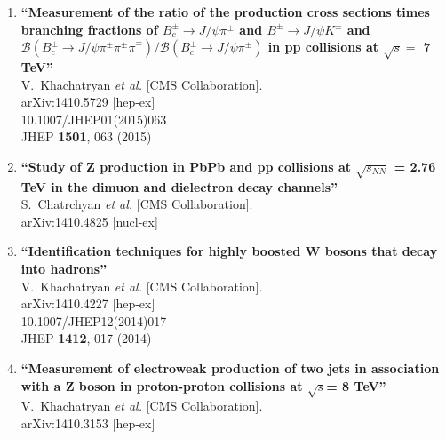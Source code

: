 \documentclass{article}
\begin{document}
\begin{enumerate}


\item%
{\bf ``Measurement of the ratio of the production cross sections times branching fractions of $B_{c}^{\pm} \to J/\psi \pi^{\pm}$ and $B^{\pm} \to J/\psi K^{\pm}$ and $\mathcal{B}(B_{c}^{\pm} \to J/\psi \pi^{\pm}\pi^{\pm}\pi^{\mp})/\mathcal{B}(B_{c}^{\pm} \to J/\psi \pi^{\pm})$ in pp collisions at $\sqrt{s} =$ 7 TeV''}
  \\{}V.~Khachatryan {\it et al.}  [CMS Collaboration].
  \\{}arXiv:1410.5729 [hep-ex]
    \\{}10.1007/JHEP01(2015)063
\\{}JHEP {\bf 1501}, 063 (2015) %


\item%
{\bf ``Study of Z production in PbPb and pp collisions at $\sqrt{s_{NN}}$ = 2.76 TeV in the dimuon and dielectron decay channels''}
  \\{}S.~Chatrchyan {\it et al.}  [CMS Collaboration].
  \\{}arXiv:1410.4825 [nucl-ex]
  


\item%
{\bf ``Identification techniques for highly boosted W bosons that decay into hadrons''}
  \\{}V.~Khachatryan {\it et al.}  [CMS Collaboration].
  \\{}arXiv:1410.4227 [hep-ex]
    \\{}10.1007/JHEP12(2014)017
\\{}JHEP {\bf 1412}, 017 (2014) %


\item%
{\bf ``Measurement of electroweak production of two jets in association with a Z boson in proton-proton collisions at $\sqrt{s}$= 8 TeV''}
  \\{}V.~Khachatryan {\it et al.}  [CMS Collaboration].
  \\{}arXiv:1410.3153 [hep-ex]
  

\end{enumerate}
\end{document}
